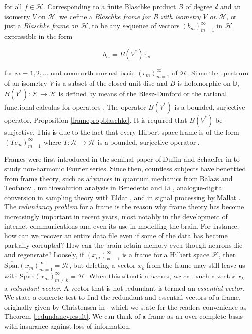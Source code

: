 \documentclass[10pt, reqno]{amsart}
\theoremstyle{definition}
\numberwithin{equation}{section}
\begin{document}
\noindent for all $f\in\mathcal{H}$. Corresponding to a finite Blaschke product $B$ of degree $d$ and an isometry $V$ on $\mathcal{H}$, we define a {\it{Blaschke frame for B with isometry $V$ on $\mathcal{H}$}}, or just a {\it{Blaschke frame on $\mathcal{H}$}}, to be any sequence of vectors $(b_{m})_{m=1}^{\infty}$ in $\mathcal{H}$ expressible in the form

$$b_{m}=B(V^{*})e_{m}$$

\noindent for $m=1,2,\hdots$ and some orthonormal basis $(e_{m})_{m=1}^{\infty}$ of $\mathcal{H}$. Since the spectrum of an isometry $V$ is a subset of the closed unit disc and $B$ is holomorphic on $\overline{\mathbb{D}}$, $B(V^{*}):\mathcal{H}\rightarrow\mathcal{H}$ is defined by means of the Riesz-Dunford or the rational functional calculus for operators \cite[Chapter 1]{AMYOperatorbook}. The operator $B(V^{*})$ is a bounded, surjective operator, Proposition \ref{framepropblaschke}. It is required that $B(V^{*})$ be surjective. This is due to the fact that every Hilbert space frame is of the form $(Te_{m})_{m=1}^{\infty}$ where $T:\mathcal{H}\rightarrow\mathcal{H}$ is a bounded, surjective operator \cite[Theorem 5.5.4]{Christensen}.

Frames were first introduced in the seminal paper of Duffin and Schaeffer in \cite{frameog} to study non-harmonic Fourier series. Since then, countless subjects have benefitted from frame theory, such as advances in quantum mechanics from Balazs and Teofanov \cite{quantum}, multiresolution analysis in Benedetto and Li \cite{multires}, analogue-digital conversion in sampling theory with Eldar \cite{eldar}, and in signal processing by Mallat \cite{mallat}. The {\it{redundancy problem}} for a frame is the reason why frame theory has become increasingly important in recent years, most notably in the development of internet communications and even its use in modelling the brain. For instance, how can we recover an entire data file even if some of the data has become partially corrupted? How can the brain retain memory even though neurons die and regenerate? Loosely, if $(x_{m})_{m=1}^{\infty}$ is a frame for a Hilbert space $\mathcal{H}$, then $\overline{\mathrm{Span}}(x_{m})_{m=1}^{\infty} = \mathcal{H}$, but deleting a vector $x_{k}$ from the frame may still leave us with $\overline{\mathrm{Span}}(x_{m})_{m\neq k}^{\infty} = \mathcal{H}$. When this situation occurs, we call such a vector $x_{k}$ a {\it{redundant vector}}. A vector that is not redundant is termed an {\it{essential vector}}. We state a concrete test to find the redundant and essential vectors of a frame, originally given by Christensen in \cite[Theorem 5.4.7]{Christensen}, which we state for the readers convenience as Theorem \ref{redundancyresult}. We can think of a frame as an over-complete basis with insurance against loss of information. 
\end{document}
